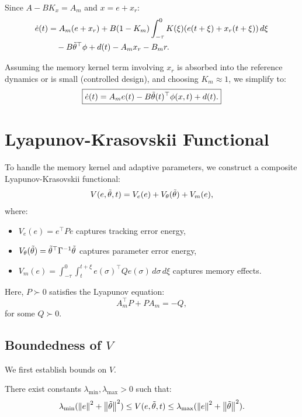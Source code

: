 Since $A - BK_x = A_m$ and $x = e + x_r$:
\begin{align}
    \dot{e}(t) &= A_m (e + x_r) + B(1 - K_m) \int_{-\tau}^0 K(\xi) (e(t+\xi) + x_r(t+\xi)) \, d\xi \nonumber \\
    &\quad - B \tilde{\theta}^\top \phi + d(t) - A_m x_r - B_m r.
\end{align}

Assuming the memory kernel term involving $x_r$ is absorbed into the reference dynamics or is small (controlled design), and choosing $K_m \approx 1$, we simplify to:
\begin{equation}
    \label{eq:error_dynamics}
    \boxed{\dot{e}(t) = A_m e(t) - B \tilde{\theta}(t)^\top \phi(x,t) + d(t).}
\end{equation}

\section{Lyapunov-Krasovskii Functional}

To handle the memory kernel and adaptive parameters, we construct a composite Lyapunov-Krasovskii functional:
\begin{equation}
    \label{eq:lyap_candidate}
    V(e, \tilde{\theta}, t) = V_e(e) + V_\theta(\tilde{\theta}) + V_m(e),
\end{equation}
where:
\begin{itemize}
    \item $V_e(e) = e^\top P e$ captures tracking error energy,
    \item $V_\theta(\tilde{\theta}) = \tilde{\theta}^\top \Gamma^{-1} \tilde{\theta}$ captures parameter error energy,
    \item $V_m(e) = \int_{-\tau}^0 \int_t^{t+\xi} e(\sigma)^\top Q e(\sigma) \, d\sigma \, d\xi$ captures memory effects.
\end{itemize}

Here, $P \succ 0$ satisfies the Lyapunov equation:
\begin{equation}
    \label{eq:lyap_eqn}
    A_m^\top P + P A_m = -Q,
\end{equation}
for some $Q \succ 0$.

\subsection{Boundedness of $V$}

We first establish bounds on $V$.

\begin{lemma}[Bounds on $V$]
There exist constants $\lambda_{\min}, \lambda_{\max} > 0$ such that:
\begin{equation}
    \lambda_{\min} (\left\| e \right\|^2 + \left\| \tilde{\theta} \right\|^2) \leq V(e, \tilde{\theta}, t) \leq \lambda_{\max} (\left\| e \right\|^2 + \left\| \tilde{\theta} \right\|^2).
\end{equation}
\end{lemma}

